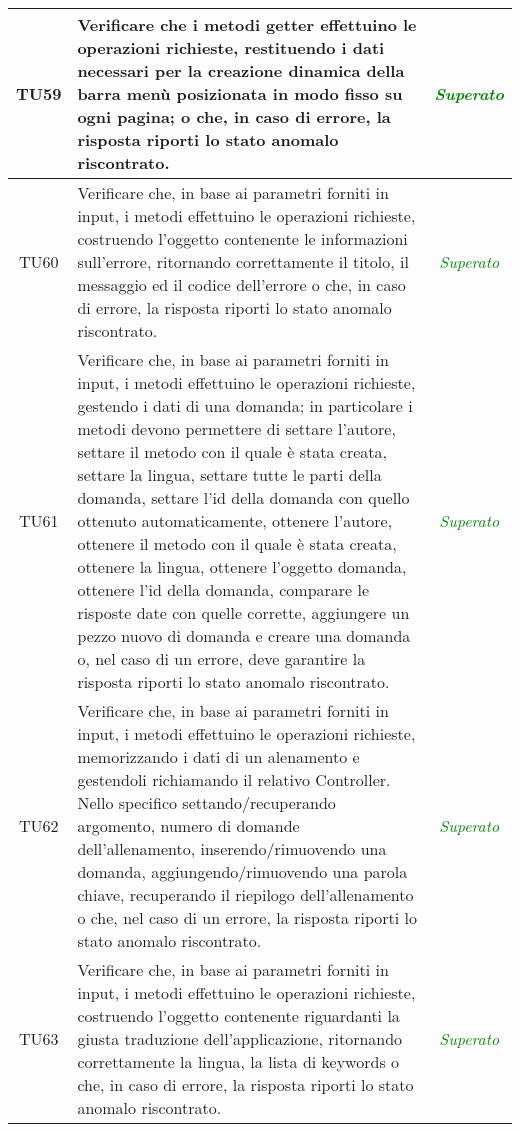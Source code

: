 \begin{longtable}{|c|>{}m{10cm}|c|}
\hypertarget{TU59}{TU59} & Verificare che i metodi getter effettuino le operazioni
richieste, restituendo i dati necessari per la creazione dinamica della barra
menù posizionata in modo fisso su ogni pagina; o che, in caso di errore, la risposta riporti lo
stato anomalo riscontrato. & \textcolor{Green}{\textit{Superato}}\\ \hline
\hypertarget{TU60}{TU60} & Verificare che, in base ai parametri forniti in input,
i metodi effettuino le operazioni richieste, costruendo l’oggetto contenente le informazioni sull'errore,
ritornando correttamente il titolo, il messaggio ed il
codice dell’errore o che, in caso di errore, la risposta
riporti lo stato anomalo riscontrato. & \textcolor{Green}{\textit{Superato}}\\ \hline
\hypertarget{TU61}{TU61} & Verificare che, in base ai parametri forniti in input, i metodi effettuino le operazioni richieste, gestendo i dati di una domanda; in particolare i metodi devono permettere di settare l'autore, settare il metodo con il quale è stata creata, settare la lingua, settare tutte le parti della domanda, settare l'id della domanda con quello ottenuto automaticamente, ottenere l'autore, ottenere il metodo con il quale è stata creata, ottenere la lingua, ottenere l'oggetto domanda, ottenere l'id della domanda, comparare le risposte date con quelle corrette, aggiungere un pezzo nuovo di domanda e creare una domanda o, nel caso di un errore, deve garantire la risposta riporti lo stato anomalo riscontrato. & \textcolor{Green}{\textit{Superato}}\\ \hline
\hypertarget{TU62}{TU62} & Verificare che, in base ai parametri forniti in input, i metodi effettuino le operazioni richieste, memorizzando i dati di un alenamento e gestendoli richiamando il relativo Controller. Nello specifico settando/recuperando argomento, numero di domande dell'allenamento, inserendo/rimuovendo una domanda, aggiungendo/rimuovendo una parola chiave, recuperando il riepilogo dell'allenamento o che, nel caso di un errore, la risposta riporti lo stato anomalo riscontrato. & \textcolor{Green}{\textit{Superato}}\\ \hline
\hypertarget{TU63}{TU63} & Verificare che, in base ai parametri forniti in input,
i metodi effettuino le operazioni richieste, costruendo l’oggetto contenente riguardanti la giusta traduzione dell’applicazione, ritornando correttamente la lingua, la lista di keywords o che, in caso di errore, la risposta riporti lo stato anomalo riscontrato. & \textcolor{Green}{\textit{Superato}}\\ \hline

\end{longtable}
